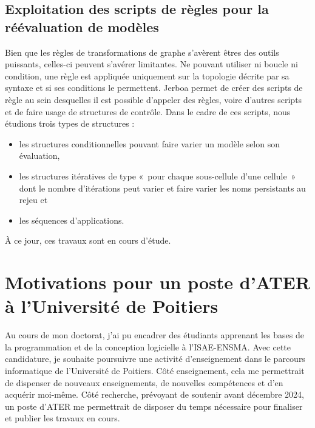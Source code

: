 \documentclass[11pt,a4paper,oneside]{article}
\begin{document}
\subsection{Exploitation des scripts de règles pour la réévaluation de modèles}
Bien que les règles de transformations de graphe s'avèrent êtres des outils
puissants, celles-ci peuvent s'avérer limitantes. %
Ne pouvant utiliser ni boucle ni condition, une règle est appliquée uniquement
sur la topologie décrite par sa syntaxe et si ses conditions le permettent. %
Jerboa permet de créer des scripts de règle au sein desquelles il est possible
d'appeler des règles, voire d'autres scripts et de faire usage de structures de
contrôle. %
Dans le cadre de ces scripts, nous étudions trois types de structures :
\begin{itemize}
	\item les structures conditionnelles pouvant faire varier un modèle selon son
	      évaluation,
	\item les structures itératives de type «~pour chaque sous-cellule d'une
	      cellule~» dont le nombre d'itérations peut varier et faire varier les
	      noms persistants au rejeu et
	\item les séquences d'applications.
\end{itemize}
À ce jour, ces travaux sont en cours d'étude.

\section{Motivations pour un poste d'ATER à l'Université de Poitiers}

Au cours de mon doctorat, j'ai pu encadrer des étudiants apprenant les bases de
la programmation et de la conception logicielle à l'ISAE-ENSMA. %
Avec cette candidature, je souhaite poursuivre une activité d'enseignement dans
le parcours informatique de l'Université de Poitiers. %
Côté enseignement, cela me permettrait de dispenser de nouveaux enseignements,
de nouvelles compétences et d'en acquérir moi-même. %
Côté recherche, prévoyant de soutenir avant décembre 2024, un poste d'ATER me
permettrait de disposer du temps nécessaire pour finaliser et publier les
travaux en cours. %

\printbibliography
\end{document}
